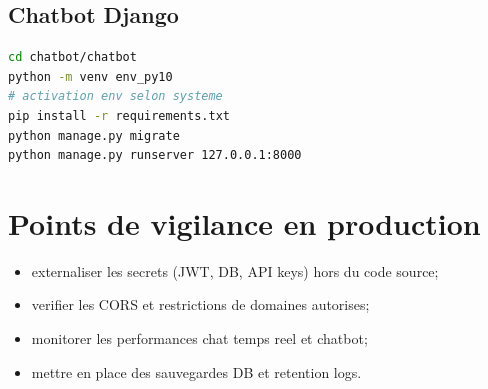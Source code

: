 \subsection*{Chatbot Django}
\begin{lstlisting}[style=codeblock,language=bash]
cd chatbot/chatbot
python -m venv env_py10
# activation env selon systeme
pip install -r requirements.txt
python manage.py migrate
python manage.py runserver 127.0.0.1:8000
\end{lstlisting}

\section{Points de vigilance en production}

\begin{itemize}[leftmargin=*]
  \item externaliser les secrets (JWT, DB, API keys) hors du code source;
  \item verifier les CORS et restrictions de domaines autorises;
  \item monitorer les performances chat temps reel et chatbot;
  \item mettre en place des sauvegardes DB et retention logs.
\end{itemize}
